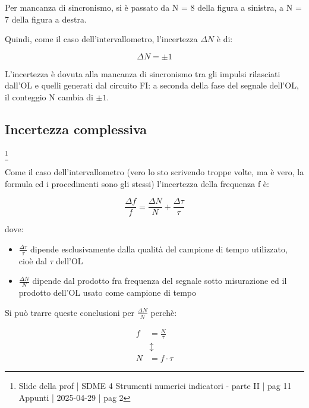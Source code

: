 Per mancanza di sincronismo, si è passato da N = 8 della figura a sinistra, 
a N = 7 della figura a destra. \newline 

Quindi, come il caso dell'intervallometro, l'incertezza $\Delta N$ è di: 

{
    \Large
    \begin{equation}
        \Delta N = \pm 1
    \end{equation}
}

L'incertezza è dovuta alla mancanza di sincronismo tra gli impulsi rilasciati dall'OL e quelli generati dal circuito FI: 
a seconda della fase del segnale dell'OL, il conteggio N cambia di $\pm 1$. \newline

\newpage 

\subsection{Incertezza complessiva}
\footnote{Slide della prof | SDME 4 Strumenti numerici indicatori - parte II | pag 11 \\  
Appunti | 2025-04-29 | pag 2}

Come il caso dell'intervallometro (vero lo sto scrivendo troppe volte, ma è vero, la formula ed i procedimenti sono gli stessi) 
l'incertezza della frequenza f è: 

{
    \Large 
    \begin{equation}
        \frac{\Delta f}{f}
        =
        \frac{\Delta N}{N}
        + 
        \frac{\Delta \tau}{\tau}
    \end{equation}
}

dove: 

\begin{itemize}
    \item $\frac{\Delta \tau}{\tau}$ dipende esclusivamente dalla qualità del campione di tempo utilizzato, cioè dal $\tau$ dell'OL 
    \item $\frac{\Delta N}{N}$ dipende dal prodotto fra frequenza del segnale sotto misurazione ed il prodotto dell'OL usato come campione di tempo
\end{itemize}

Si può trarre queste conclusioni per $\frac{\Delta N}{N}$ perchè: 

{
    \Large 
    \begin{equation}
        \begin{split}
            f &= \frac{N}{\tau}
            \\ 
            &\updownarrow
            \\ 
            N &= f \cdot \tau
        \end{split}
    \end{equation}
}


